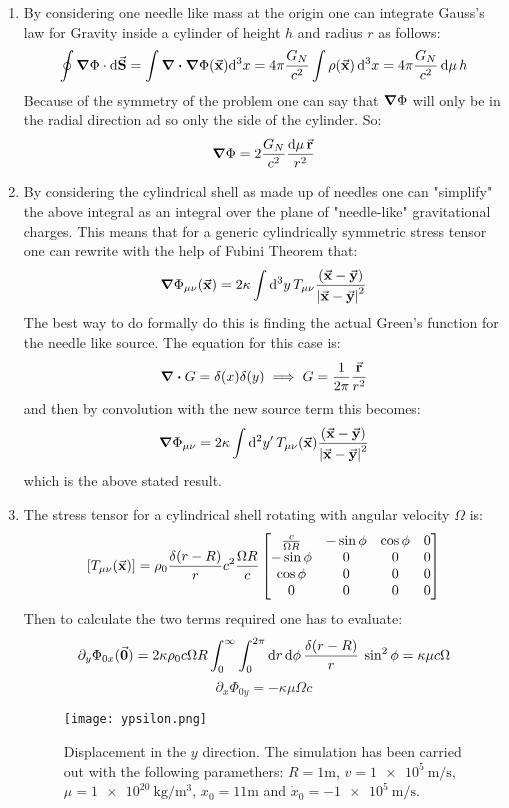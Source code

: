 \documentclass[11pt, oneside]{article}
\begin{document}
\begin{enumerate}

\item By considering one needle like mass at the origin one can integrate Gauss's law for Gravity inside a cylinder of height $h$ and radius $r$ as follows:
\[
	\oint  \grad \Phi \cdot \dd \va{S}= \int \div \grad \Phi (\va{x}) \dd[3]x = 4\pi \frac{G_N}{c^2} \int \rho(\va{x}) \dd[3]{x} = 4\pi \frac{G_N}{c^2} \dd{\mu} h
\]
Because of the symmetry of the problem one can say that $\grad\Phi$ will only be in the radial direction ad so only the side of the cylinder. So:
\[
	\grad \Phi = 2 \frac{G_N}{c^2} \frac{\dd{\mu}\va{r}}{r^2}
\]

\item By considering the cylindrical shell as made up of needles one can "simplify" the above integral as an integral over the plane of "needle-like" gravitational charges. This means that for a generic cylindrically symmetric stress tensor one can rewrite with the help of Fubini Theorem that:
\[
	\grad \Phi_{\mu\nu} (\va{x}) = 2 \kappa \int \dd[3]{y} T_{\mu\nu} \frac{(\va{x} - \va{y})}{\abs{\va{x} - \va{y}}^2}
\]
The best way to do formally do this is finding the actual Green's function for the needle like source. The equation for this case is:
\[
	\div G = \delta(x)\delta(y) \implies G = \frac{1}{2\pi} \frac{\va{r}}{r^2}
\]
and then by convolution with the new source term this becomes:
\[
	\grad \Phi_{\mu\nu} = 2\kappa \int \dd[2]{y'} T_{\mu\nu} (\va{x}) \frac{(\va{x} - \va{y})}{\abs{\va{x} - \va{y}}^2}
\]
which is the above stated result.

\item The stress tensor for a cylindrical shell rotating with angular velocity $\Omega$ is:
\[
	[T_{\mu\nu}(\va{x})] = \rho_0 \frac{\delta(r - R)}{r} c^2 \frac{\Omega R}{c} \begin{bmatrix}
		\frac{c}{\Omega R} &- \sin\phi & \cos\phi& 0 \\
		- \sin\phi & 0 & 0 & 0 \\
		 \cos\phi & 0 & 0 & 0 \\
		0 & 0 & 0 & 0 \\
	\end{bmatrix}
\]
Then to calculate the two terms required one has to evaluate:
\[
	\partial_y \Phi_{0x} (\va{0}) = 2 \kappa \rho_0 c\Omega R \int_0^{\infty}\int_0^{2\pi} \dd{r} \dd{\phi} \frac{\delta(r-R)}{r} \: \sin^2\phi = \kappa \mu c \Omega
\]
\[
	\partial_x \Phi_{0y} = -\kappa \mu \Omega c
\]

\begin{figure}[htbp]
   \centering
   \texttt{[image: ypsilon.png]} %
   \caption{Displacement in the $y$ direction. The simulation has been carried out with the following paramethers: $R=1\si{\meter}$, $v=\SI{1e5}{\meter\per\second}$, $\mu = \SI{1e20}{\kilo\gram\per\meter\cubed}$, $x_0 = 11\si{\meter}$ and $\dot{x}_0 = \SI{-1e5}{\meter\per\second}$.}
   \label{fig:ypsilon}
\end{figure}


\end{enumerate}
\end{document}
